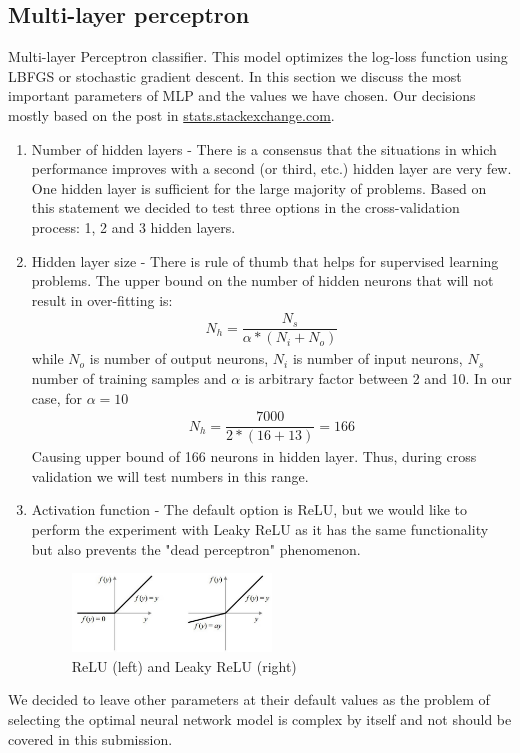 \documentclass[12pt]{article}
\begin{document}
\subsection{Multi-layer perceptron}
Multi-layer Perceptron classifier. This model optimizes the log-loss function using LBFGS or stochastic gradient descent. In this section we discuss the most important parameters of MLP and the values we have chosen. Our decisions mostly based on the post in \href{https://stats.stackexchange.com/questions/181/how-to-choose-the-number-of-hidden-layers-and-nodes-in-a-feedforward-neural-netw}{stats.stackexchange.com}.
\begin{enumerate}
	\item Number of hidden layers - There is a consensus that the situations in which performance improves with a second (or third, etc.) hidden layer are very few. One hidden layer is sufficient for the large majority of problems. Based on this statement we decided to test three options in the cross-validation process: 1, 2 and 3 hidden layers.
	\item Hidden layer size - There is rule of thumb that helps for supervised learning problems. The upper bound on the number of hidden neurons that will not result in over-fitting is:
\begin{gather*}
N_h = \dfrac{N_s}{\alpha * (N_i + N_o)}
\end{gather*}
while $N_o$ is number of output neurons, $N_i$ is number of input neurons, $N_s$ number of training samples and $\alpha$ is arbitrary factor between 2 and 10. In our case, for $\alpha = 10$
\begin{gather*}
N_h = \dfrac{7000}{2 * (16 + 13)} = 166
\end{gather*}
Causing upper bound of 166 neurons in hidden layer. Thus, during cross validation we will test numbers in this range.
	\item Activation function - The default option is ReLU, but we would like to perform the experiment with Leaky ReLU as it has the same functionality but also prevents the "dead perceptron" phenomenon.
\begin{figure}[h]
\centering
\includegraphics[width=0.5\textwidth]{report_pics/relu}
\caption{ReLU (left) and Leaky ReLU (right)}
\end{figure}
\end{enumerate}
We decided to leave other parameters at their default values as the problem of selecting the optimal neural network model is complex by itself and not should be covered in this submission. 
\end{document}
